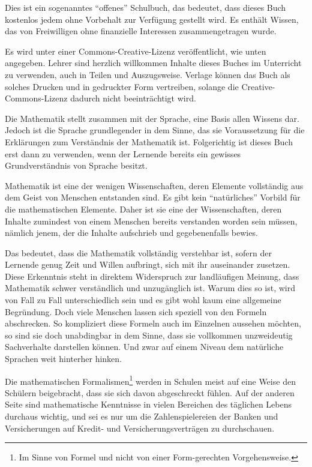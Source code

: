 \preface

Dies ist ein sogenanntes "`offenes"' Schulbuch, das bedeutet, dass dieses Buch kostenlos jedem ohne Vorbehalt zur Verfügung gestellt wird. Es enthält Wissen, das von Freiwilligen ohne finanzielle Interessen zusammengetragen wurde. 

Es wird unter einer Commons-Creative-Lizenz veröffentlicht, wie unten angegeben. Lehrer sind herzlich willkommen Inhalte dieses Buches im Unterricht zu verwenden, auch in Teilen und Auszugsweise. Verlage können das Buch als solches Drucken und in gedruckter Form vertreiben, solange die Creative-Commons-Lizenz dadurch nicht beeinträchtigt wird.

Die Mathematik stellt zusammen mit der Sprache, eine Basis allen Wissens dar. Jedoch ist die Sprache grundlegender in dem Sinne, das sie Voraussetzung für die Erklärungen zum Verständnis der Mathematik ist. Folgerichtig ist dieses Buch erst dann zu verwenden, wenn der Lernende bereits ein gewisses Grundverständnis von Sprache besitzt. 

\bigskip

Mathematik ist eine der wenigen Wissenschaften, deren Elemente vollständig aus dem Geist von Menschen entstanden sind. Es gibt kein "`natürliches"' Vorbild für die mathematischen Elemente. Daher ist sie eine der Wissenschaften, deren Inhalte zumindest von einem Menschen bereits verstanden worden sein müssen, nämlich jenem, der die Inhalte aufschrieb und gegebenenfalls bewies.

Das bedeutet, dass die Mathematik vollständig verstehbar ist, sofern der Lernende genug Zeit und Willen aufbringt, sich mit ihr auseinander zusetzen. Diese Erkenntnis steht in direktem Widerspruch zur landläufigen Meinung, dass Mathematik schwer verständlich und unzugänglich ist. Warum dies so ist, wird von Fall zu Fall unterschiedlich sein und es gibt wohl kaum eine allgemeine Begründung. Doch viele Menschen lassen sich speziell von den Formeln abschrecken. So kompliziert diese Formeln auch im Einzelnen aussehen möchten, so sind sie doch unabdingbar in dem Sinne, dass sie vollkommen unzweideutig Sachverhalte darstellen können. Und zwar auf einem Niveau dem natürliche Sprachen weit hinterher hinken. 

Die mathematischen Formalismen\footnote{Im Sinne von Formel und nicht von einer Form-gerechten Vorgehensweise.} werden in Schulen meist auf eine Weise den Schülern beigebracht, dass sie sich davon abgeschreckt fühlen. Auf der anderen Seite sind mathematische Kenntnisse in vielen Bereichen des täglichen Lebens durchaus wichtig, und sei es nur um die Zahlenspielereien der Banken und Versicherungen auf Kredit- und Versicherungsverträgen zu durchschauen. 

